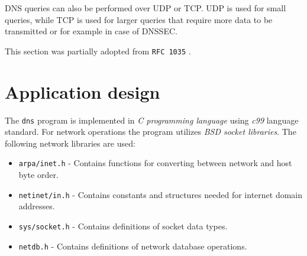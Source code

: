 \documentclass[a4paper, 11pt]{article}
\begin{document}
        DNS queries can also be performed over UDP or TCP.
        UDP is used for small queries, while TCP is used for larger queries that require more data to be transmitted or for example in case of DNSSEC.

        This section was partially adopted from \texttt{RFC 1035} \cite{1987}.

\section{Application design}

    The \texttt{dns} program is implemented in \emph{C programming language} using \emph{c99} language standard.
    For network operations the program utilizes \emph{BSD socket libraries}.
    The following network libraries are used:
    \begin{itemize}
        \item \texttt{arpa/inet.h} - Contains functions for converting between network and host byte order.
        \item \texttt{netinet/in.h} - Contains constants and structures needed for internet domain addresses.
        \item \texttt{sys/socket.h} - Contains definitions of socket data types.
        \item \texttt{netdb.h} - Contains definitions of network database operations.
    \end{itemize}
\end{document}
